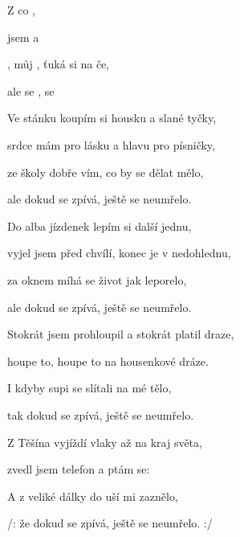 

\zs
Z    co ,   

 jsem  a     

 , můj , ťuká si na če,

ale  se ,  se     
\ks

\zs
Ve stánku koupím si housku a slané tyčky,

srdce mám pro lásku a hlavu pro písničky,

ze školy dobře vím, co by se dělat mělo,

ale dokud se zpívá, ještě se neumřelo.
\ks

\zs
Do alba jízdenek lepím si další jednu,

vyjel jsem před chvílí, konec je v nedohlednu,

za oknem míhá se život jak leporelo,

ale dokud se zpívá, ještě se neumřelo.
\ks

\zs
Stokrát jsem prohloupil a stokrát platil draze,

houpe to, houpe to na housenkové dráze.

I kdyby supi se slítali na mé tělo,

tak dokud se zpívá, ještě se neumřelo.
\ks

\zs
Z Těšína vyjíždí vlaky až na kraj světa,

zvedl jsem telefon a ptám se: 

A z veliké dálky do uší mi zaznělo,

/: že dokud se zpívá, ještě se neumřelo. :/
\ks

\kp





